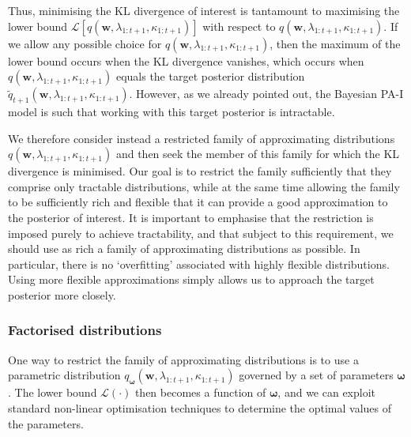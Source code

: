Thus, minimising the KL divergence of interest is tantamount to maximising the lower bound $\mathcal{L}[q(\mathbf{w}, \lambda_{1:t+1}, \kappa_{1:t+1})]$ with respect to $q(\mathbf{w}, \lambda_{1:t+1}, \kappa_{1:t+1})$. If we allow any possible choice for $q(\mathbf{w}, \lambda_{1:t+1}, \kappa_{1:t+1})$, then the maximum of the lower bound occurs when the KL divergence vanishes, which occurs when $q(\mathbf{w}, \lambda_{1:t+1}, \kappa_{1:t+1})$ equals the target posterior distribution $\widetilde{q}_{t+1}(\mathbf{w}, \lambda_{1:t+1}, \kappa_{1:t+1})$. However, as we already pointed out, the Bayesian PA-I model is such that working with this target posterior is intractable.

We therefore consider instead a restricted family of approximating distributions $q(\mathbf{w}, \lambda_{1:t+1}, \kappa_{1:t+1})$ and then seek the member of this family for which the KL divergence is minimised. Our goal is to restrict the family sufficiently that they comprise only tractable distributions, while at the same time allowing the family  to be sufficiently rich and flexible that it can provide a good approximation to the posterior of interest. It is important to emphasise that the restriction is imposed purely to achieve tractability, and that subject to this requirement, we should use as rich a family of approximating distributions as possible. In particular, there is no `overfitting' associated with highly flexible distributions. Using more flexible approximations simply allows us to approach the target posterior more closely.

\subsubsection{Factorised distributions} 

One way to restrict the family of approximating distributions is to use a parametric distribution $q_{\boldsymbol{\omega}}(\mathbf{w}, \lambda_{1:t+1}, \kappa_{1:t+1})$ governed by a set of parameters $\boldsymbol{\omega}$. The lower bound $\mathcal{L}(\cdot)$ then becomes a function of $\boldsymbol{\omega}$, and we can exploit standard non-linear optimisation techniques to determine the optimal values of the parameters.


